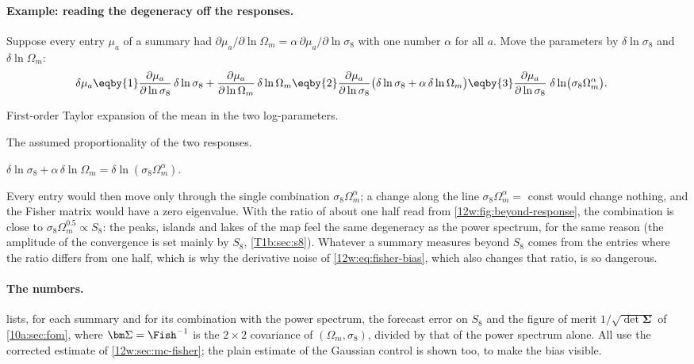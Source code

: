 \paragraph{Example: reading the degeneracy off the responses.}
Suppose every entry $\mu_a$ of a summary had $\partial\mu_a/\partial\ln\Omega_m=\alpha\,\partial\mu_a/
\partial\ln\sigma_8$ with one number $\alpha$ for all $a$. Move the parameters by $\delta\ln\sigma_8$ and
$\delta\ln\Omega_m$:
\begin{align}
\delta\mu_a
&\eqby{1}\frac{\partial\mu_a}{\partial\ln\sigma_8}\,\delta\ln\sigma_8+\frac{\partial\mu_a}{\partial\ln\Omega_m}\,
\delta\ln\Omega_m
\eqby{2}\frac{\partial\mu_a}{\partial\ln\sigma_8}\bigl(\delta\ln\sigma_8+\alpha\,\delta\ln\Omega_m\bigr)
\eqby{3}\frac{\partial\mu_a}{\partial\ln\sigma_8}\;\delta\ln\bigl(\sigma_8\Omega_m^{\alpha}\bigr).
\label{12w:eq:resp-degen}
\end{align}
\begin{explain}
  \item First-order Taylor expansion of the mean in the two log-parameters.
  \item The assumed proportionality of the two responses.
  \item $\delta\ln\sigma_8+\alpha\,\delta\ln\Omega_m=\delta\ln(\sigma_8\Omega_m^\alpha)$.
\end{explain}
Every entry would then move only through the single combination $\sigma_8\Omega_m^\alpha$; a change along the line
$\sigma_8\Omega_m^\alpha=$ const would change nothing, and the Fisher matrix would have a zero eigenvalue. With
the ratio of about one half read from \cref{12w:fig:beyond-response}, the combination is close to
$\sigma_8\Omega_m^{0.5}\propto S_8$: the peaks, islands and lakes of the map feel the same degeneracy as the power
spectrum, for the same reason (the amplitude of the convergence is set mainly by $S_8$, \cref{T1b:sec:s8}).
Whatever a summary measures beyond $S_8$ comes from the entries where the ratio differs from one half, which is why
the derivative noise of \eqref{12w:eq:fisher-bias}, which also changes that ratio, is so dangerous.

\paragraph{The numbers.}  lists, for each summary and for its combination with the power
spectrum, the forecast error on $S_8$ and the figure of merit $1/\sqrt{\det\bm\Sigma}$ of \cref{10a:sec:fom}, where
$\bm\Sigma=\Fish^{-1}$ is the $2\times2$ covariance of $(\Omega_m,\sigma_8)$, divided by that of the power spectrum
alone. All use the corrected estimate of \cref{12w:sec:mc-fisher}; the plain estimate of the Gaussian control is
shown too, to make the bias visible.

